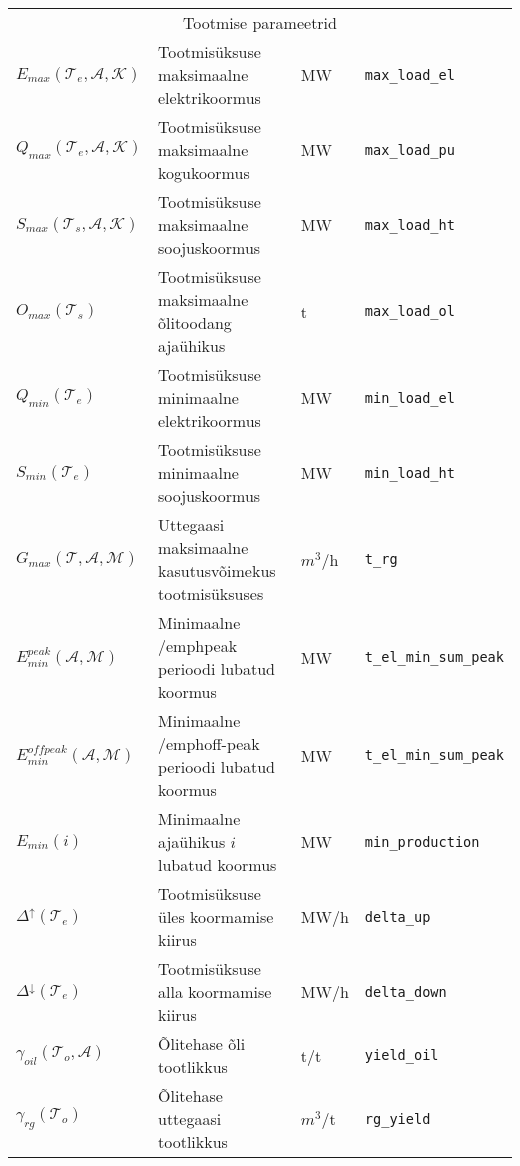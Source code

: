 \begin{landscape}
\begin{longtable}{l l l l}
\\ \multicolumn{4}{c}{Tootmise parameetrid} \\
$\mathit{E}_{max}(\mathcal{T}_e, \mathcal{A},\mathcal{K})$ & Tootmisüksuse maksimaalne elektrikoormus & MW & \texttt{max\_load\_el} \\
$\mathit{Q}_{max}(\mathcal{T}_e, \mathcal{A},\mathcal{K})$ & Tootmisüksuse maksimaalne kogukoormus & MW  & \texttt{max\_load\_pu} \\
$\mathit{S}_{max}(\mathcal{T}_s, \mathcal{A},\mathcal{K})$ & Tootmisüksuse maksimaalne soojuskoormus & MW & \texttt{max\_load\_ht}\\
$\mathit{O}_{max}(\mathcal{T}_s)$ & Tootmisüksuse maksimaalne õlitoodang ajaühikus & t & \texttt{max\_load\_ol} \\
$\mathit{Q}_{min}(\mathcal{T}_e)$ & Tootmisüksuse minimaalne elektrikoormus & MW & \texttt{min\_load\_el}\\
$\mathit{S}_{min}(\mathcal{T}_e)$ & Tootmisüksuse minimaalne soojuskoormus & MW & \texttt{min\_load\_ht}\\
$\mathit{G}_{max}(\mathcal{T}, \mathcal{A}, \mathcal{M})$&Uttegaasi maksimaalne kasutusvõimekus tootmisüksuses& $m^3$/h&\texttt{t\_rg}\\
$\mathit{E}_{min}^{peak}(\mathcal{A}, \mathcal{M})$& Minimaalne /emph{peak} perioodi lubatud koormus & MW & \texttt{t\_el\_min\_sum\_peak} \\
$\mathit{E}_{min}^{offpeak}(\mathcal{A}, \mathcal{M})$&Minimaalne /emph{off-peak} perioodi lubatud koormus & MW & \texttt{t\_el\_min\_sum\_peak} \\
$\mathit{E}_{min}(i)$&Minimaalne ajaühikus  $i$ lubatud koormus & MW & \texttt{min\_production} \\


$\mathit{\Delta^{\uparrow}}(\mathcal{T}_e)$ & Tootmisüksuse üles koormamise kiirus & MW/h & \texttt{delta\_up} \\
$\mathit{\Delta^{\downarrow}}(\mathcal{T}_e)$ & Tootmisüksuse alla koormamise kiirus & MW/h & \texttt{delta\_down} \\

$\mathit{\gamma}_{oil}(\mathcal{T}_o, \mathcal{A})$ & Õlitehase õli tootlikkus & t/t & \texttt{yield\_oil} \\
$\mathit{\gamma}_{rg}(\mathcal{T}_o)$ & Õlitehase uttegaasi tootlikkus & $m^3$/t & \texttt{rg\_yield} \\


\end{longtable}
\end{landscape}
